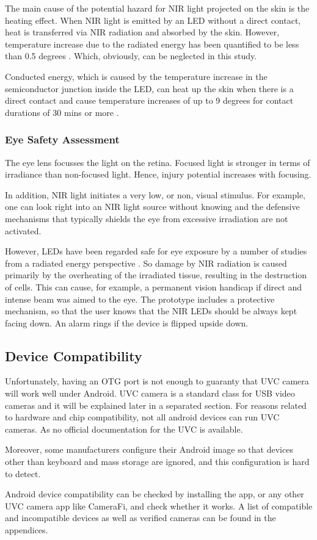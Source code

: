 The main cause of the potential hazard for NIR light projected on the skin is the heating effect. When NIR light is emitted by an LED without a direct contact, heat is transferred via NIR radiation and absorbed by the skin. However, temperature increase due to the radiated energy has been quantified to be less than 0.5 degrees \parencite{ledSafety}. Which, obviously, can be neglected in this study.

Conducted energy, which is caused by the temperature increase in the semiconductor junction inside the LED, can heat up the skin when there is a direct contact and cause temperature increases of up to 9 degrees for contact durations of 30 mins or more \parencite{ledSafety}.

\subsubsection {Eye Safety Assessment}
The eye lens focusses the light on the retina. Focused light is stronger in terms of irradiance than non-focused light. Hence, injury potential increases with focusing.

In addition, NIR light initiates a very low, or non, visual stimulus. For example, one can look right into an NIR light source without knowing and the defensive mechanisms that typically shields the eye from excessive irradiation are not activated.

However, LEDs have been regarded safe for eye exposure by a number of studies from a radiated energy perspective \parencite{ledEyeSafe1} \parencite{ledEyeSafe2}.
So damage by NIR radiation is caused primarily by the overheating of the irradiated tissue, resulting in the destruction of cells. This can cause, for example, a permanent vision handicap \parencite{ledEyeSafe3} if direct and intense beam was aimed to the eye.
The prototype includes a protective mechanism, so that the user knows that the NIR LEDs should be always kept facing down. An alarm rings if the device is flipped upside down.

\subsection{Device Compatibility}

Unfortunately, having an OTG port is not enough to guaranty that UVC camera will work well under Android. UVC camera is a standard class for USB video cameras and it will be explained later in a separated section. For reasons related to hardware and chip compatibility, not all android devices can run UVC cameras. As no official documentation for the UVC is available. 

Moreover, some manufacturers configure their Android image so that devices other than keyboard and mass storage are ignored, and this configuration is hard to detect. 

Android device compatibility can be checked by installing the app, or any other UVC camera app like CameraFi, and check whether it works. 
A list of compatible and incompatible devices as well as verified cameras can be found in the appendices.


